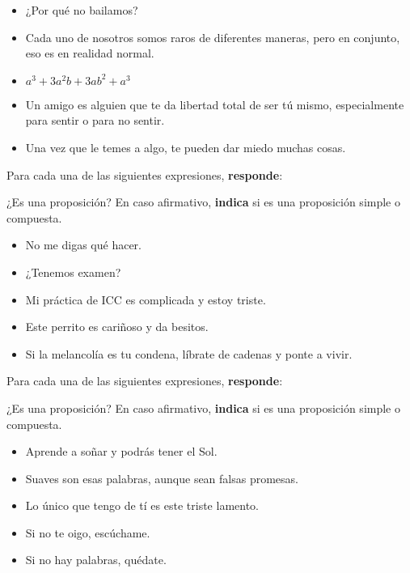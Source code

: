 \documentclass[oneside]{style}
\begin{document}
\begin{questions}[label=\protect\circled{\bfseries\arabic*}]
{        \begin{itemize}
            \item ¿Por qué no bailamos? 
            \item Cada uno de nosotros somos raros de diferentes maneras, pero 
            en conjunto, eso es en realidad normal. 
            \item $a^3 + 3a^2b + 3ab^2 +a^3$
            \item Un amigo es alguien que te da libertad total de ser tú mismo, 
            especialmente para sentir o para no sentir. 
            \item Una vez que le temes a algo, te pueden dar miedo muchas cosas. 
        \end{itemize}
    }

    \question
    {
        Para cada una de las siguientes expresiones, \textbf{responde}:
        \begin{center}
            ¿Es una proposición? En caso afirmativo, \textbf{indica} si 
            es una proposición simple o compuesta. 
        \end{center}

        \begin{itemize}
            \item No me digas qué hacer. 
            \item ¿Tenemos examen?
            \item Mi práctica de ICC es complicada y estoy triste. 
            \item Este perrito es cariñoso y da besitos. 
            \item Si la melancolía es tu condena, líbrate de cadenas y ponte 
            a vivir. 
        \end{itemize}
    }

    \newpage
    \question
    {
        Para cada una de las siguientes expresiones, \textbf{responde}:
        \begin{center}
            ¿Es una proposición? En caso afirmativo, \textbf{indica} si 
            es una proposición simple o compuesta. 
        \end{center}

        \begin{itemize}
            \item Aprende a soñar y podrás tener el Sol. 
            \item Suaves son esas palabras, aunque sean falsas promesas. 
            \item Lo único que tengo de tí es este triste lamento. 
            \item Si no te oigo, escúchame. 
            \item Si no hay palabras, quédate. 
        \end{itemize}
    }


\end{questions}
\end{document}
